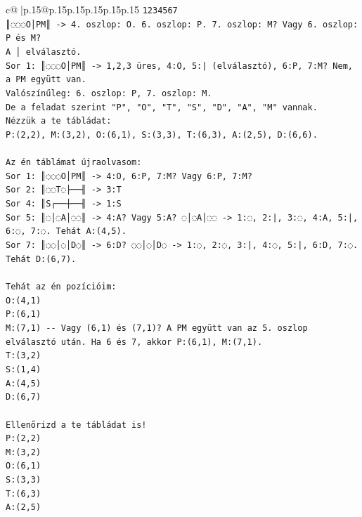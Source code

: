 \documentclass{article}
\begin{document}
{\begin{supertabular}{c@{$\;$}|p{.15\linewidth}@{}p{.15\linewidth}p{.15\linewidth}p{.15\linewidth}p{.15\linewidth}p{.15\linewidth}}
{{{\texttt{1234567} \\
\texttt{║◌◌◌O│PM║ {-}> 4. oszlop: O. 6. oszlop: P. 7. oszlop: M? Vagy 6. oszlop: P és M?} \\
\texttt{A │ elválasztó.} \\
\texttt{Sor 1: ║◌◌◌O│PM║ {-}> 1,2,3 üres, 4:O, 5:| (elválasztó), 6:P, 7:M? Nem, a PM együtt van.} \\
\texttt{Valószínűleg: 6. oszlop: P, 7. oszlop: M.} \\
\texttt{De a feladat szerint "P", "O", "T", "S", "D", "A", "M" vannak.} \\
\texttt{Nézzük a te tábládat:} \\
\texttt{P:(2,2), M:(3,2), O:(6,1), S:(3,3), T:(6,3), A:(2,5), D:(6,6).} \\
\\ 
\texttt{Az én táblámat újraolvasom:} \\
\texttt{Sor 1: ║◌◌◌O│PM║ {-}> 4:O, 6:P, 7:M? Vagy 6:P, 7:M?} \\
\texttt{Sor 2: ║◌◌T◌├──╢ {-}> 3:T} \\
\texttt{Sor 4: ║S┌──┼──╢ {-}> 1:S} \\
\texttt{Sor 5: ║◌│◌A│◌◌║ {-}> 4:A? Vagy 5:A? ◌│◌A│◌◌ {-}> 1:◌, 2:|, 3:◌, 4:A, 5:|, 6:◌, 7:◌. Tehát A:(4,5).} \\
\texttt{Sor 7: ║◌◌│◌│D◌║ {-}> 6:D? ◌◌│◌│D◌ {-}> 1:◌, 2:◌, 3:|, 4:◌, 5:|, 6:D, 7:◌. Tehát D:(6,7).} \\
\\ 
\texttt{Tehát az én pozícióim:} \\
\texttt{O:(4,1)} \\
\texttt{P:(6,1)} \\
\texttt{M:(7,1) {-}{-} Vagy (6,1) és (7,1)? A PM együtt van az 5. oszlop elválasztó után. Ha 6 és 7, akkor P:(6,1), M:(7,1).} \\
\texttt{T:(3,2)} \\
\texttt{S:(1,4)} \\
\texttt{A:(4,5)} \\
\texttt{D:(6,7)} \\
\\ 
\texttt{Ellenőrizd a te tábládat is!} \\
\texttt{P:(2,2)} \\
\texttt{M:(3,2)} \\
\texttt{O:(6,1)} \\
\texttt{S:(3,3)} \\
\texttt{T:(6,3)} \\
\texttt{A:(2,5)} \\
}}}
\end{supertabular}}
\end{document}
